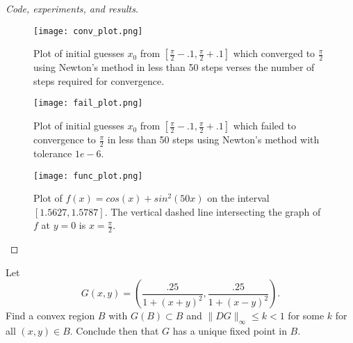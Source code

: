 \documentclass[8pt]{article}
\theoremstyle{definition}
\newenvironment{exercise}[1]
  {\renewcommand\theinnerexercise{#1}\innerexercise}
  {\endinnerexercise}
\begin{document}
\begin{proof}[Code, experiments, and results]
\begin{figure}[H]
	\texttt{[image: conv\_plot.png]}
	\vspace{-10mm}
	\caption{Plot of initial guesses $x_0$ from $\left[ \frac{\pi}{2} - .1, \frac{\pi}{2} + .1 \right]$ which converged to $\frac{\pi}{2}$ using Newton's method in less than 50 steps verses the number of steps required for convergence.}
	\label{Figure 1}
\end{figure}

\begin{figure}[H]
	\texttt{[image: fail\_plot.png]}
	\vspace{-8mm}
	\caption{Plot of initial guesses $x_0$ from $\left[ \frac{\pi}{2} - .1, \frac{\pi}{2} + .1 \right]$ which failed to convergence to $\frac{\pi}{2}$ in less than 50 steps using Newton's method with tolerance $1e-6$.}
	\label{Figure 2}
\end{figure}

\begin{figure}[H]
	\texttt{[image: func\_plot.png]}
	\vspace{-8mm}
	\caption{Plot of $f(x) = cos(x) + sin^2 (50 x)$ on the interval $[1.5627, 1.5787]$. The vertical dashed line intersecting the graph of $f$ at $y = 0$ is $x = \frac{\pi}{2}$.}
	\label{Figure 3}
\end{figure}
\end{proof}

\newpage

\begin{exercise}{3}
Let $$G(x, y) = \left( \frac{.25}{1 + (x + y)^2} , \frac{.25}{1 + (x - y)^2} \right).$$ Find a convex region $B$ with $G(B) \subset B$ and $\| DG \|_{\infty} \leq k < 1$ for some $k$ for all $(x, y) \in B$. Conclude then that $G$ has a unique fixed point in $B$.
\end{exercise}
\end{document}
